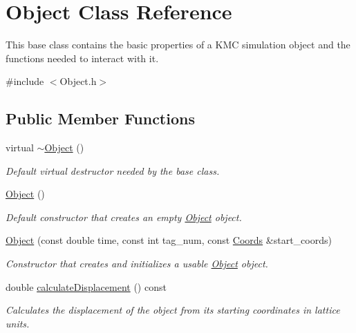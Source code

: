 \hypertarget{class_object}{}\section{Object Class Reference}
\label{class_object}


This base class contains the basic properties of a K\+MC simulation object and the functions needed to interact with it.  




{\ttfamily \#include $<$Object.\+h$>$}

\subsection*{Public Member Functions}
\begin{DoxyCompactItemize}
\item 
\mbox{\label{class_object_ae8f5483f459e46687bd01e6f9977afd3}} 
virtual \hyperlink{class_object_ae8f5483f459e46687bd01e6f9977afd3}{$\sim$\+Object} ()
\begin{DoxyCompactList}\small\item\em Default virtual destructor needed by the base class. \end{DoxyCompactList}\item 
\mbox{\label{class_object_a40860402e64d8008fb42329df7097cdb}} 
\hyperlink{class_object_a40860402e64d8008fb42329df7097cdb}{Object} ()
\begin{DoxyCompactList}\small\item\em Default constructor that creates an empty \hyperlink{class_object}{Object} object. \end{DoxyCompactList}\item 
\hyperlink{class_object_aff050a622272cc7667251c7315f09fd7}{Object} (const double time, const int tag\+\_\+num, const \hyperlink{struct_coords}{Coords} \&start\+\_\+coords)
\begin{DoxyCompactList}\small\item\em Constructor that creates and initializes a usable \hyperlink{class_object}{Object} object. \end{DoxyCompactList}\item 
double \hyperlink{class_object_a02643ea0804dec3e43f60c788855c03b}{calculate\+Displacement} () const
\begin{DoxyCompactList}\small\item\em Calculates the displacement of the object from its starting coordinates in lattice units. \end{DoxyCompactList}\item 

\end{DoxyCompactItemize}
